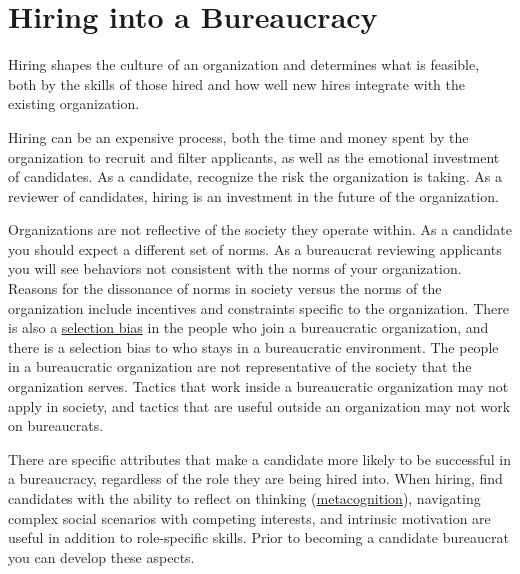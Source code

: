 



\section{Hiring into a Bureaucracy\label{sec:hiring}}


Hiring shapes the culture of an organization and determines what is feasible, both by the skills of those hired and how well new hires integrate with the existing organization. 

Hiring can be an expensive process, both the time and money spent by the organization to recruit and filter applicants, as well as the emotional investment of candidates. %
As a candidate, recognize the risk the organization is taking. 
As a reviewer of candidates, hiring is an investment in the future of the organization. %

Organizations are not reflective of the society they operate within. As a candidate you should expect a different set of norms. As a bureaucrat reviewing applicants you will see behaviors not consistent with the norms of your organization. 
Reasons for the dissonance of norms in society versus the norms of the organization include incentives and constraints specific to the organization. 
There is also a \href{https://en.wikipedia.org/wiki/Selection_bias}{selection bias} in
the people who join a bureaucratic organization, and there is a selection bias to who stays in a bureaucratic environment. 
The people in a bureaucratic organization are not representative of the society that the organization serves. Tactics that work inside a bureaucratic organization may not apply in society, and tactics that are useful outside an organization may not work on bureaucrats. 



There are specific attributes that make a candidate more likely to be successful in a bureaucracy, regardless of the role they are being hired into. When hiring, find candidates with the ability to reflect on thinking (\href{https://en.wikipedia.org/wiki/Metacognition}{metacognition}),
\iftoggle{WPinmargin}{\marginpar{$>$Wikipedia: Metacognition}}{}
navigating complex social scenarios with competing interests, and intrinsic motivation are useful in addition to role-specific skills. Prior to becoming a candidate bureaucrat you can develop these aspects. 




